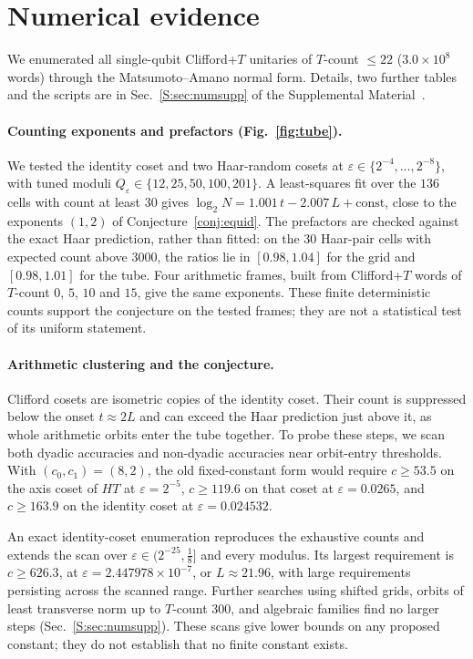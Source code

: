 \documentclass[aps,prx,twocolumn,superscriptaddress,nofootinbib,longbibliography]{revtex4-2}
\theoremstyle{plain}
\theoremstyle{definition}
\theoremstyle{remark}
\begin{document}
\section{Numerical evidence}\label{sec:num}

We enumerated all single-qubit Clifford+$T$ unitaries of $T$-count $\le22$ ($3.0\times10^8$ words) through the Matsumoto--Amano normal form. Details, two further tables and the scripts are in Sec.~\ref{S:sec:numsupp} of the Supplemental Material~\cite{SM}.

\paragraph{Counting exponents and prefactors (Fig.~\ref{fig:tube}).} We tested the identity coset and two Haar-random cosets at $\varepsilon\in\{2^{-4},\dots,2^{-8}\}$, with tuned moduli $Q_\varepsilon\in\{12,25,50,100,201\}$. A least-squares fit over the $136$ cells with count at least $30$ gives $\log_2N=1.001\,t-2.007\,L+\text{const}$, close to the exponents $(1,2)$ of Conjecture~\ref{conj:equid}. The prefactors are checked against the exact Haar prediction, rather than fitted: on the $30$ Haar-pair cells with expected count above $3000$, the ratios lie in $[0.98,1.04]$ for the grid and $[0.98,1.01]$ for the tube. Four arithmetic frames, built from Clifford+$T$ words of $T$-count $0$, $5$, $10$ and $15$, give the same exponents. These finite deterministic counts support the conjecture on the tested frames; they are not a statistical test of its uniform statement.

\paragraph{Arithmetic clustering and the conjecture.} Clifford cosets are isometric copies of the identity coset. Their count is suppressed below the onset $t\approx2L$ and can exceed the Haar prediction just above it, as whole arithmetic orbits enter the tube together. To probe these steps, we scan both dyadic accuracies and non-dyadic accuracies near orbit-entry thresholds. With $(c_0,c_1)=(8,2)$, the old fixed-constant form would require $c\ge53.5$ on the axis coset of $HT$ at $\varepsilon=2^{-5}$, $c\ge119.6$ on that coset at $\varepsilon=0.0265$, and $c\ge163.9$ on the identity coset at $\varepsilon=0.024532$.

An exact identity-coset enumeration reproduces the exhaustive counts and extends the scan over $\varepsilon\in(2^{-25},\tfrac18]$ and every modulus. Its largest requirement is $c\ge626.3$, at $\varepsilon=2.447978\times10^{-7}$, or $L\approx21.96$, with large requirements persisting across the scanned range. Further searches using shifted grids, orbits of least transverse norm up to $T$-count $300$, and algebraic families find no larger steps (Sec.~\ref{S:sec:numsupp}). These scans give lower bounds on any proposed constant; they do not establish that no finite constant exists.
\end{document}
